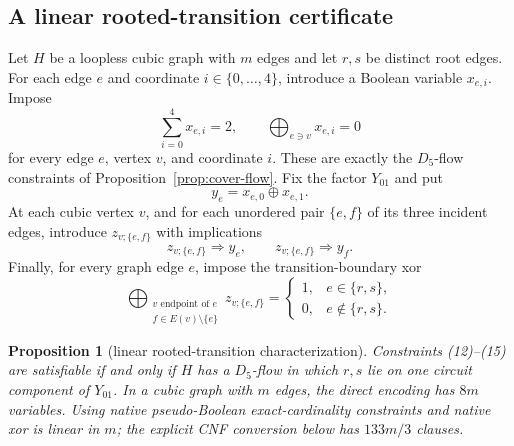 \documentclass[11pt]{article}
\newtheorem{proposition}[theorem]{Proposition}
\theoremstyle{definition}
\theoremstyle{remark}
\begin{document}
\subsection{A linear rooted-transition certificate}

Let \(H\) be a loopless cubic graph with \(m\) edges and let \(r,s\) be
distinct root edges.  For each edge \(e\) and coordinate
\(i\in\{0,\ldots,4\}\), introduce a Boolean variable \(x_{e,i}\).  Impose
\[
       \sum_{i=0}^4x_{e,i}=2,
       \qquad
       \bigoplus_{e\ni v}x_{e,i}=0                           \tag{12}
\]
for every edge \(e\), vertex \(v\), and coordinate \(i\).  These are
exactly the \(D_5\)-flow constraints of
Proposition~\ref{prop:cover-flow}.  Fix the factor \(Y_{01}\) and put
\[
                         y_e=x_{e,0}\oplus x_{e,1}.            \tag{13}
\]
At each cubic vertex \(v\), and for each unordered pair \(\{e,f\}\) of
its three incident edges, introduce \(z_{v;\{e,f\}}\) with implications
\[
             z_{v;\{e,f\}}\Longrightarrow y_e,
             \qquad z_{v;\{e,f\}}\Longrightarrow y_f.        \tag{14}
\]
Finally, for every graph edge \(e\), impose the transition-boundary xor
\[
 \bigoplus_{\substack{v\text{ endpoint of }e\\
                       f\in E(v)\setminus\{e\}}}
 z_{v;\{e,f\}}
 =\begin{cases}1,&e\in\{r,s\},\\0,&e\notin\{r,s\}.
  \end{cases}                                                 \tag{15}
\]

\begin{proposition}[linear rooted-transition characterization]
\label{prop:linear-root-transition}
Constraints \emph{(12)}--\emph{(15)} are satisfiable if and only if
\(H\) has a \(D_5\)-flow in which \(r,s\) lie on one circuit component
of \(Y_{01}\).  In a cubic graph with \(m\) edges, the direct encoding has
\(8m\) variables.  Using native pseudo-Boolean exact-cardinality constraints
and native xor is linear in \(m\); the explicit CNF conversion below has
\(133m/3\) clauses.
\end{proposition}
\end{document}
